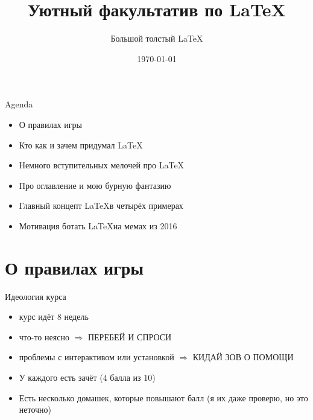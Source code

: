 \documentclass[aspectratio=169,newPxFont]{beamer}
\title{Уютный факультатив по \LaTeX}
\subtitle{Большой толстый \LaTeX}
\date{\today}
\begin{document}
\begingroup
{}
\begin{frame}[plain]
\begin{center}
\Huge{\color{red}{ВНИМАНИЕ!}}
\end{center}

\begin{center}
\end{center}
\end{frame}
\endgroup

 \maketitle
 
\begin{frame}{Agenda}
\begin{itemize}
	\item О правилах игры 
	\item Кто как и зачем придумал \LaTeX
	\item Немного вступительных мелочей про \LaTeX
	\item Про оглавление и мою бурную фантазию 
	\item Главный концепт  \LaTeX в четырёх примерах
	\item Мотивация ботать \LaTeX на мемах из 2016
\end{itemize}
\end{frame}


\section{О правилах игры}


\begin{frame}{Идеология курса}
\begin{itemize}
\item курс идёт 8 недель
\item что-то неясно $\Rightarrow$ \alert{ ПЕРЕБЕЙ И СПРОСИ}
\item проблемы с интерактивом или установкой  $\Rightarrow$ \alert{КИДАЙ ЗОВ О ПОМОЩИ} 
\item  У каждого есть зачёт ($4$ балла из $10$)
\item Есть несколько домашек, которые повышают балл (я их даже проверю, но это неточно)
\end{itemize}
\end{frame}
\end{document}

